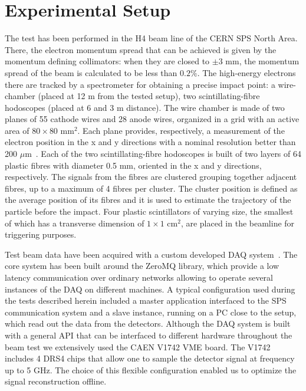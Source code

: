 \documentclass[a4paper,11pt]{article}
\begin{document}
\section{Experimental Setup}
\label{sec:experimentalsetup}
The test has been performed in the H4 beam line of the CERN SPS North Area. There, the electron momentum spread that can be achieved is given by the momentum defining collimators: when they are closed to $\pm 3$ mm, the momentum spread of the beam is calculated to be less than $0.2\%$\cite{r-GRA}. 
The high-energy electrons there are tracked by a spectrometer for obtaining a precise impact point: a wire-chamber (placed at 12 m from the tested setup), two scintillating-fibre hodoscopes (placed at 6 and 3 m distance). The wire chamber is made of two planes of 55 cathode wires and 28 anode wires, organized in a grid with an active area of $80\times 80$ mm$^2$. Each plane provides, respectively, a measurement of the electron position in the x and y directions with a nominal resolution better than 200 $\mu$m~\cite{r-SPA}.
Each of the two scintillating-fibre hodoscopes is built of two layers of 64 plastic fibres with diameter 0.5 mm, oriented in the x and y directions, respectively. The signals from the fibres are clustered grouping together adjacent fibres, up to a maximum of 4 fibres per cluster. The cluster position is defined as the average position of its fibres and it is used to estimate the trajectory of the particle before the impact.
Four plastic scintillators of varying size, the smallest of which has a transverse dimension of $1 \times 1$ cm$^2$, are placed in the beamline for triggering purposes.

Test beam data have been acquired with a custom developed DAQ system~\cite{r-MAR}. The core system has been built around the ZeroMQ library, which provide a low latency communication over ordinary networks allowing to operate several instances of the DAQ on different machines. A typical  configuration used during the tests described  herein included a master application interfaced to the SPS communication system and a slave instance, running on a PC close to the setup, which read out the data from the detectors. Although the DAQ system is built with a general API that can be interfaced to different hardware throughout the beam test we extensively used the CAEN V1742 VME board. The V1742 includes 4 DRS4 chips that allow one to sample the detector signal at frequency up to 5 GHz. The choice of this flexible configuration enabled us to optimize the signal reconstruction offline.
\end{document}
